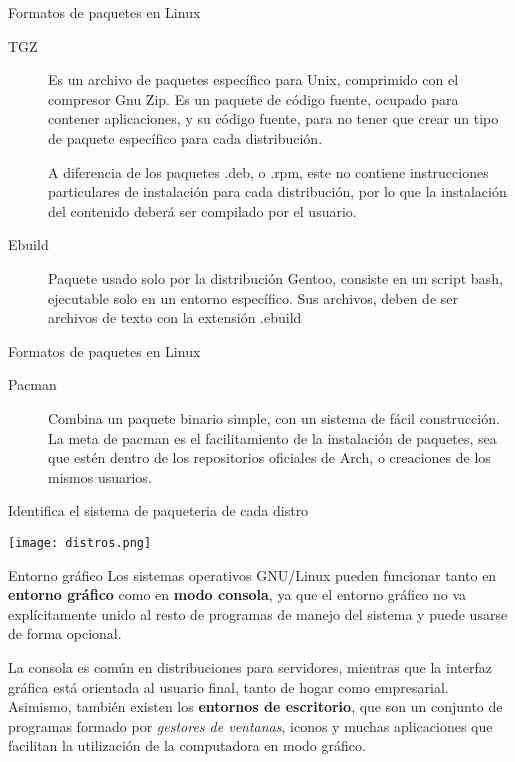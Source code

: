 \begin{frame}[c]{Formatos de paquetes en Linux}
  \begin{description}
    \item [TGZ] Es un archivo de paquetes específico para Unix, comprimido
      con el compresor Gnu Zip. Es un paquete de código fuente, ocupado para
      contener aplicaciones, y su código fuente, para no tener que crear un
      tipo de paquete específico para cada distribución.

      A diferencia de los
      paquetes .deb, o .rpm, este no contiene instrucciones particulares de
      instalación para cada distribución, por lo que la instalación del
      contenido deberá ser compilado por el usuario.

    \pausa
    \item [Ebuild] Paquete usado solo por la distribución Gentoo, consiste en
      un script bash, ejecutable solo en un entorno específico. Sus archivos,
      deben de ser archivos de texto con la extensión .ebuild
  \end{description}
\end{frame}

\begin{frame}[c]{Formatos de paquetes en Linux}
  \begin{description}
    \item [Pacman] Combina un paquete binario simple, con un sistema de fácil
      construcción. La meta de pacman es el facilitamiento de la instalación
      de paquetes, sea que estén dentro de los repositorios oficiales de Arch,
      o creaciones de los mismos usuarios.
  \end{description}
\end{frame}

\begin{frame}[c]{Identifica el sistema de paqueteria de cada distro}
  \begin{center}
    \texttt{[image: distros.png]}
  \end{center}
\end{frame}

\begin{frame}[c]{Entorno gráfico}
  Los sistemas operativos GNU/Linux pueden funcionar tanto en
  \textbf{entorno gráfico} como en \textbf{modo consola}, ya que el entorno
  gráfico no va explícitamente unido al resto de programas de manejo del
  sistema y puede usarse de forma opcional.

  \vspace{\baselineskip}
  La consola es común en distribuciones para servidores, mientras que la
  interfaz gráfica está orientada al usuario final, tanto de hogar como
  empresarial. Asimismo, también existen los \textbf{entornos de escritorio},
  que son un conjunto de programas formado por \emph{gestores de ventanas},
  iconos y muchas aplicaciones que facilitan la utilización de la
  computadora en modo gráfico.

\end{frame}

